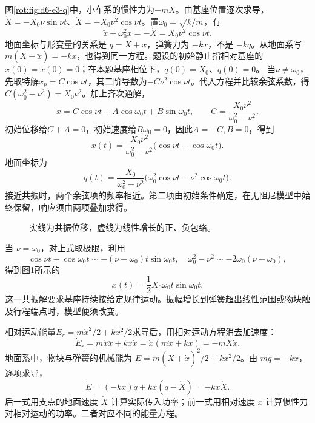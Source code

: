 \begin{solution}
图\ref{rot:fig:d6-e3-q}中，小车系的惯性力为$-m\ddot X$。由基座位置逐次求导，$\dot X=-X_0\nu\sin\nu t$、$\ddot X=-X_0\nu^2\cos\nu t$。置$\omega_0=\sqrt{k/m}$，有
\[
\ddot x+\omega_0^2x=-\ddot X=X_0\nu^2\cos\nu t.
\]
地面坐标与形变量的关系是 $q=X+x$，弹簧力为 $-kx$，不是 $-kq$。从地面系写 $m(\ddot X+\ddot x)=-kx$，也得到同一方程。题设的初始静止指相对基座的 $x(0)=\dot x(0)=0$；在本题基座相位下，$q(0)=X_0$、$\dot q(0)=0$。
当$\nu\ne\omega_0$，先取特解$x_p=C\cos\nu t$，其二阶导数为$-C\nu^2\cos\nu t$。代入方程并比较余弦系数，得$C(\omega_0^2-\nu^2)=X_0\nu^2$。加上齐次通解，
\[
x=C\cos\nu t+A\cos\omega_0t+B\sin\omega_0t,
\qquad C=\frac{X_0\nu^2}{\omega_0^2-\nu^2}.
\]
初始位移给$C+A=0$，初始速度给$B\omega_0=0$，因此$A=-C,B=0$，得到
\[
x(t)=\frac{X_0\nu^2}{\omega_0^2-\nu^2}
\big(\cos\nu t-\cos\omega_0t\big).
\]
地面坐标为
\[
q(t)=\frac{X_0}{\omega_0^2-\nu^2}
\big(\omega_0^2\cos\nu t-\nu^2\cos\omega_0t\big).
\]
接近共振时，两个余弦项的频率相近。第二项由初始条件确定，在无阻尼模型中始终保留，响应须由两项叠加求得。
\begin{figure}[H]\centering
{}
\caption{实线为共振位移，虚线为线性增长的正、负包络。}\label{rot:fig:d6-e3-s}
\end{figure}
当 $\nu=\omega_0$，对上式取极限，利用
\[
\cos\nu t-\cos\omega_0t\sim-(\nu-\omega_0)t\sin\omega_0t,
\quad \omega_0^2-\nu^2\sim-2\omega_0(\nu-\omega_0),
\]
得到图\ref{rot:fig:d6-e3-s}所示的
\[
x(t)=\frac12X_0\omega_0t\sin\omega_0t.
\]
这一共振解要求基座持续按给定规律运动。振幅增长到弹簧超出线性范围或物块触及行程端点时，模型便须改变。

相对运动能量$E_r=m\dot x^2/2+kx^2/2$求导后，用相对运动方程消去加速度：
\[
\dot E_r=m\dot x\ddot x+kx\dot x
=\dot x(m\ddot x+kx)=-m\ddot X\dot x.
\]
地面系中，物块与弹簧的机械能为 $E=m(\dot X+\dot x)^2/2+kx^2/2$。由 $m\ddot q=-kx$，逐项求导，
\[
\dot E=(-kx)\dot q+kx(\dot q-\dot X)=-kx\dot X.
\]
后一式用支点的地面速度 $\dot X$ 计算实际传入功率；前一式用相对速度 $\dot x$ 计算惯性力对相对运动的功率。二者对应不同的能量方程。
\end{solution}



